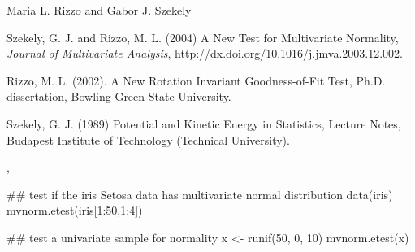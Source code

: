\documentclass{article}
\begin{document}
\begin{Author}\relax
Maria L. Rizzo  and
Gabor J. Szekely 
\end{Author}
\begin{References}\relax
Szekely, G. J. and Rizzo, M. L. (2004) A New Test for 
Multivariate Normality, \emph{Journal of Multivariate Analysis},
\url{http://dx.doi.org/10.1016/j.jmva.2003.12.002}.

Rizzo, M. L. (2002). A New Rotation Invariant Goodness-of-Fit Test,
Ph.D. dissertation, Bowling Green State University.

Szekely, G. J. (1989) Potential and Kinetic Energy in Statistics, 
Lecture Notes, Budapest Institute of Technology (Technical University).\end{References}
\begin{SeeAlso}\relax
{},
\end{SeeAlso}
\begin{Examples}
\begin{ExampleCode}
 ## test if the iris Setosa data has multivariate normal distribution
 data(iris)
 mvnorm.etest(iris[1:50,1:4])
 
 ## test a univariate sample for normality
 x <- runif(50, 0, 10)
 mvnorm.etest(x)
 \end{ExampleCode}
\end{Examples}
\end{document}
